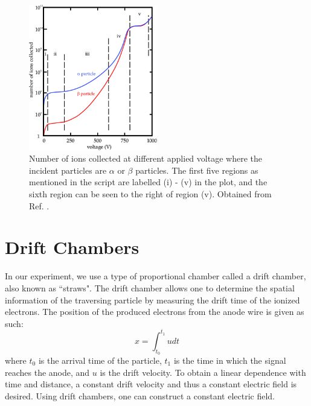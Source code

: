 \documentclass[a4paper]{report}
\numberwithin{equation}{section}
\begin{document}
\begin{figure}[htb!]
	\centering
	\includegraphics[width=0.5\textwidth]{ionization_regions.png}
	\caption{Number of ions collected at different applied voltage where the incident particles are $\alpha$ or $\beta$ particles. 
	The first five regions as mentioned in the script are labelled (i) - (v) in the plot, and the sixth region can be seen to the right of region (v). 
	Obtained from Ref. \cite{Lukas2018}. }
	\label{fig:ionization_regions}	
\end{figure}

\section{Drift Chambers}

In our experiment, we use a type of proportional chamber called a drift chamber, also known as ``straws". The drift chamber allows one to determine the spatial information 
of the traversing particle by measuring the drift time of the ionized electrons. The position of the produced electrons from the anode wire is 
given as such: 
\begin{equation}
	x = \int_{t_0}^{t_1} u dt
\end{equation}
where $t_0$ is the arrival time of the particle, $t_1$ is the time in which the signal reaches the anode, and $u$ is the drift velocity. To obtain a 
linear dependence with time and distance, a constant drift velocity and thus a constant electric field is desired. Using drift chambers, one can 
construct a constant electric field. \par 
\end{document}

